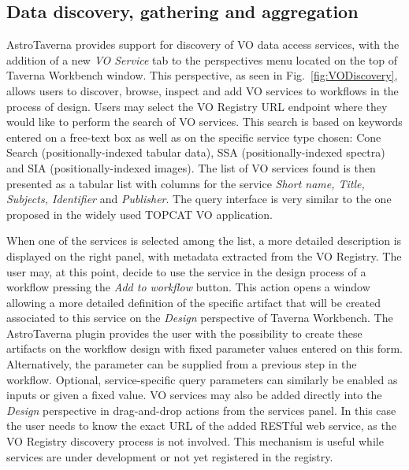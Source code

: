 \documentclass[final,authoryear,5p,times,twocolumn]{elsarticle}
\begin{document}
\subsection{Data discovery, gathering and aggregation}
\label{DataDiscovery}

AstroTaverna provides support for discovery of VO data access services, with the addition of a new \textit{VO Service} tab to the perspectives menu located on the top of Taverna Workbench window. This perspective, as seen in Fig.~\ref{fig:VODiscovery}, allows users to discover, browse, inspect and add VO services to workflows in the process of design. Users may select the VO Registry URL endpoint where they would like to perform the search of VO services. This search is based on keywords entered on a free-text box as well as on the specific service type chosen: Cone Search (positionally-indexed tabular data), SSA (positionally-indexed spectra) and SIA (positionally-indexed images). The list of VO services found is then presented as a tabular list with columns for the service \textit{Short name, Title, Subjects, Identifier} and \textit{Publisher}. The query interface is very similar to the one proposed in the widely used TOPCAT VO application. 

When one of the services is selected among the list, a more detailed description is displayed on the right panel, with metadata extracted from the VO Registry. The user may, at this point, decide to use the service in the design process of a workflow pressing the \textit{Add to workflow} button. This action opens a window allowing a more detailed definition of the specific artifact that will be created associated to this service on the \emph{Design} perspective of Taverna Workbench. The AstroTaverna plugin provides the user with the possibility to create these artifacts on the workflow design with fixed parameter values entered on this form. Alternatively, the parameter can be supplied from a previous step in the workflow. Optional, service-specific query parameters can similarly be enabled as inputs or given a fixed value. VO services may also be added directly into the \emph{Design} perspective in drag-and-drop actions from the services panel. In this case the user needs to know the exact URL of the added RESTful web service, as the VO Registry discovery process is not involved. This mechanism is useful while services are under development or not yet registered in the registry.
\end{document}
